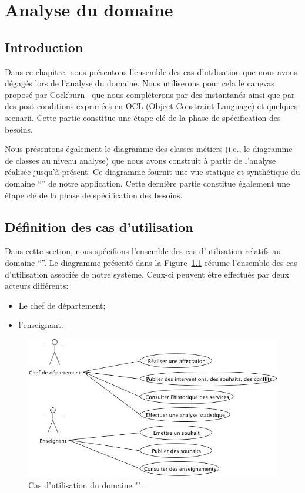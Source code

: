
\chapter{Analyse du domaine}
\section{Introduction}

Dans ce chapitre, nous présentons l'ensemble des cas d'utilisation que nous avons dégagés lors de l'analyse du domaine. Nous utiliserons pour cela le canevas proposé par Cockburn~\cite{Cockburn:2000} que nous compléterons par des instantanés ainsi que par des post-conditions exprimées en OCL (Object Constraint Language) et quelques scenarii. Cette partie constitue une étape clé de la phase de spécification des besoins. 

Nous présentons également le diagramme des classes métiers (i.e., le diagramme de classes au niveau analyse) que nous avons construit à partir de l'analyse réalisée jusqu'à présent. 
Ce diagramme fournit une vue statique et synthétique du domaine ``\projet'' de notre application. 
Cette dernière partie constitue également une étape clé de la phase de spécification des besoins.


\section{Définition des cas d'utilisation}
Dans cette section, nous spécifions  l'ensemble des cas d'utilisation relatifs au domaine ``\projet''. Le diagramme présenté dans la Figure~\ref{fig:usecases} résume l'ensemble des cas d'utilisation associés de notre système. Ceux-ci peuvent être effectués par deux acteurs différents:
 \begin{itemize}
 \item Le chef de département;
 \item l'enseignant.
 \end{itemize}

 \vspace{2cm}

 \begin{figure}[!htbp]
 \begin{center}
 \includegraphics[width=14cm]{fig/useCaseDiagram.jpg}
 \caption{Cas d'utilisation du domaine "\projet".}
 \end{center}
 \label{fig:usecases}
 \end{figure}

